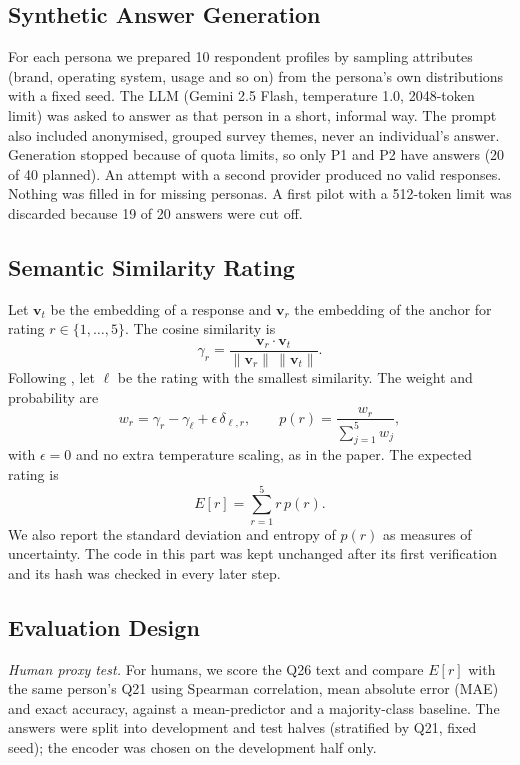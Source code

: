 \documentclass[conference]{IEEEtran}
\begin{document}
\subsection{Synthetic Answer Generation}
For each persona we prepared 10 respondent profiles by sampling attributes (brand, operating system, usage and so on) from the persona's own distributions with a fixed seed. The LLM (Gemini 2.5 Flash, temperature 1.0, 2048-token limit) was asked to answer as that person in a short, informal way. The prompt also included anonymised, grouped survey themes, never an individual's answer. Generation stopped because of quota limits, so only P1 and P2 have answers (20 of 40 planned). An attempt with a second provider produced no valid responses. Nothing was filled in for missing personas. A first pilot with a 512-token limit was discarded because 19 of 20 answers were cut off.

\subsection{Semantic Similarity Rating}
Let $\mathbf{v}_t$ be the embedding of a response and $\mathbf{v}_r$ the embedding of the anchor for rating $r\in\{1,\ldots,5\}$. The cosine similarity is
\begin{equation}
\gamma_r=\frac{\mathbf{v}_r\cdot\mathbf{v}_t}{\|\mathbf{v}_r\|\,\|\mathbf{v}_t\|}.
\end{equation}
Following \cite{maier2025}, let $\ell$ be the rating with the smallest similarity. The weight and probability are
\begin{equation}
w_r=\gamma_r-\gamma_\ell+\epsilon\,\delta_{\ell,r},\qquad p(r)=\frac{w_r}{\sum_{j=1}^{5}w_j},
\end{equation}
with $\epsilon=0$ and no extra temperature scaling, as in the paper. The expected rating is
\begin{equation}
E[r]=\sum_{r=1}^{5} r\,p(r).
\end{equation}
We also report the standard deviation and entropy of $p(r)$ as measures of uncertainty. The code in this part was kept unchanged after its first verification and its hash was checked in every later step.

\subsection{Evaluation Design}
\textit{Human proxy test.} For humans, we score the Q26 text and compare $E[r]$ with the same person's Q21 using Spearman correlation, mean absolute error (MAE) and exact accuracy, against a mean-predictor and a majority-class baseline. The answers were split into development and test halves (stratified by Q21, fixed seed); the encoder was chosen on the development half only.
\end{document}
